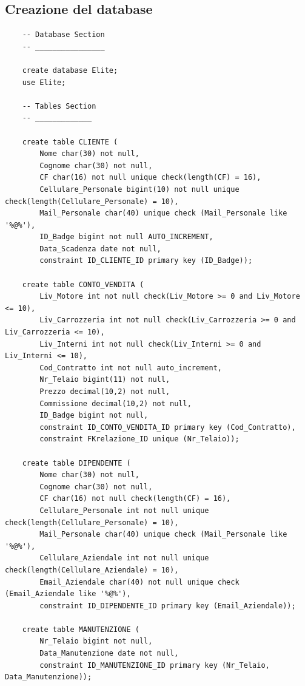 \documentclass[11pt]{article}
\begin{document}
\newpage

\subsection{Creazione del database}

\lstset{style=sqlStyle}

\begin{lstlisting}
    -- Database Section
    -- ________________ 

    create database Elite;
    use Elite;

    -- Tables Section
    -- _____________ 

    create table CLIENTE (
        Nome char(30) not null,
        Cognome char(30) not null,
        CF char(16) not null unique check(length(CF) = 16),
        Cellulare_Personale bigint(10) not null unique check(length(Cellulare_Personale) = 10),
        Mail_Personale char(40) unique check (Mail_Personale like '%@%'),
        ID_Badge bigint not null AUTO_INCREMENT,
        Data_Scadenza date not null,
        constraint ID_CLIENTE_ID primary key (ID_Badge));

    create table CONTO_VENDITA (
        Liv_Motore int not null check(Liv_Motore >= 0 and Liv_Motore <= 10),
        Liv_Carrozzeria int not null check(Liv_Carrozzeria >= 0 and Liv_Carrozzeria <= 10),
        Liv_Interni int not null check(Liv_Interni >= 0 and Liv_Interni <= 10),
        Cod_Contratto int not null auto_increment,
        Nr_Telaio bigint(11) not null,
        Prezzo decimal(10,2) not null,
        Commissione decimal(10,2) not null,
        ID_Badge bigint not null,
        constraint ID_CONTO_VENDITA_ID primary key (Cod_Contratto),
        constraint FKrelazione_ID unique (Nr_Telaio));

    create table DIPENDENTE (
        Nome char(30) not null,
        Cognome char(30) not null,
        CF char(16) not null check(length(CF) = 16),
        Cellulare_Personale int not null unique check(length(Cellulare_Personale) = 10),
        Mail_Personale char(40) unique check (Mail_Personale like '%@%'),
        Cellulare_Aziendale int not null unique check(length(Cellulare_Aziendale) = 10),
        Email_Aziendale char(40) not null unique check (Email_Aziendale like '%@%'),
        constraint ID_DIPENDENTE_ID primary key (Email_Aziendale));

    create table MANUTENZIONE (
        Nr_Telaio bigint not null,
        Data_Manutenzione date not null,
        constraint ID_MANUTENZIONE_ID primary key (Nr_Telaio, Data_Manutenzione));


\end{lstlisting}
\end{document}
